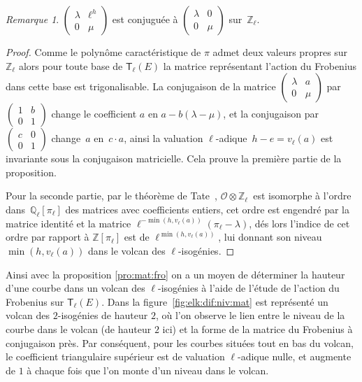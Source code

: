 \documentclass[10pt,a4paper]{book}
\theoremstyle{plain}
\theoremstyle{definition}
\theoremstyle{definition}
\theoremstyle{definition}
\theoremstyle{definition}
\theoremstyle{definition}
\theoremstyle{remark}
\newtheorem{rem}[thm]{Remarque}
\theoremstyle{remark}
\theoremstyle{definition}
\begin{document}
\begin{rem}
$\left(\begin{smallmatrix} \lambda & \ell^h \\ 0 &
\mu \end{smallmatrix}\right)$ est conjuguée à $\left(\begin{smallmatrix} \lambda & 0 \\ 0 & \mu\end{smallmatrix}\right)$ sur~$\mathbb{Z}_{\ell}$.
\end{rem}

\begin{proof}
Comme le polynôme caractéristique de $\pi$ admet deux valeurs propres sur 
$\mathbb{Z}_{\ell}$ alors pour toute base de $\mathsf{T}_{\ell}(E)$ la matrice
représentant l'action du Frobenius dans cette base est trigonalisable. %
La conjugaison de la matrice $\left ( \begin{smallmatrix}\lambda & a\\0 & \mu
\end{smallmatrix}\right )$ par~$\left ( \begin{smallmatrix}1 & b\\0 & 1
\end{smallmatrix} \right )$ change le coefficient $a$ en $a-b (\lambda - \mu)$, 
et la conjugaison par ~$\left(\begin{smallmatrix} c & 0 \\ 0 &
1\end{smallmatrix}\right)$ change~$a$ en~$c \cdot a$,
ainsi la valuation $\ell$-adique~$h-e = v_{\ell}(a)$ est invariante sous la 
conjugaison matricielle. Cela prouve la première partie de la proposition. 

Pour la seconde partie, par le théorème de 
Tate~\cite[Isogeny theorem III.7.7 (a)]{Silv1}, $\mathcal{O} \otimes 
 \mathbb{Z}_{\ell}$~est isomorphe à l'ordre dans~$\mathbb{Q}_{\ell}[\pi_{\ell}]$
des matrices avec coefficients entiers, cet ordre est engendré par la matrice 
 identité et la matrice $\ell^{-\min (h, v_\ell(a))} (\pi_{\ell}-\lambda)$, dés 
 lors l'indice de cet ordre par rapport à $\mathbb{Z}[\pi_{\ell}]$ est de 
$\ell^{\min (h, v_\ell(a))}$, lui donnant son niveau $\min (h, v_\ell(a))$ dans 
 le volcan des $\ell$-isogénies.
\end{proof}

Ainsi avec la proposition \ref{pro:mat:fro} on a un moyen de déterminer la 
hauteur d'une courbe dans un volcan des $\ell$-isogénies à l'aide de l'étude de 
l'action du Frobenius sur $\mathsf{T}_{\ell}(E)$. Dans la 
figure~\ref{fig:elk:dif:niv:mat} est représenté un volcan des $2$-isogénies 
de hauteur $2$, où l'on observe le lien entre le niveau de la courbe dans le 
volcan (de hauteur $2$ ici) et la forme de la matrice du Frobenius à conjugaison 
près. Par conséquent, pour les courbes situées tout en bas du volcan, le coefficient 
triangulaire supérieur est de valuation $\ell$-adique nulle, et augmente
de $1$ à chaque fois que l'on monte d'un niveau dans le volcan.
\end{document}
